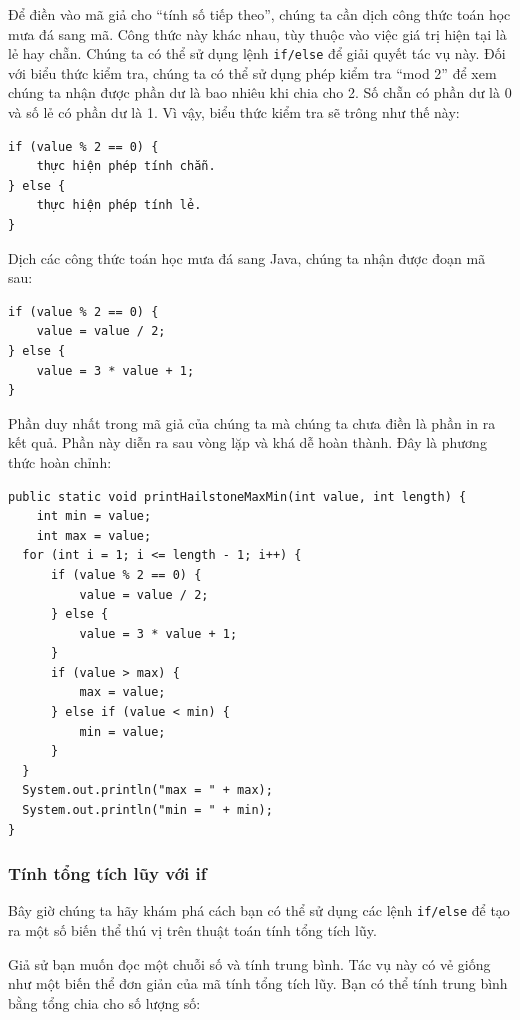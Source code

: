 Để điền vào mã giả cho ``tính số tiếp theo'', chúng ta cần dịch công
thức toán học mưa đá sang mã. Công thức này khác nhau, tùy thuộc vào
việc giá trị hiện tại là lẻ hay chẵn. Chúng ta có thể sử dụng lệnh
\texttt{if/else} để giải quyết tác vụ này. Đối với biểu thức kiểm tra,
chúng ta có thể sử dụng phép kiểm tra ``mod 2'' để xem chúng ta nhận
được phần dư là bao nhiêu khi chia cho 2. Số chẵn có phần dư là 0 và số
lẻ có phần dư là 1. Vì vậy, biểu thức kiểm tra sẽ trông như thế này:

\begin{verbatim}
if (value % 2 == 0) {
    thực hiện phép tính chẵn.
} else {
    thực hiện phép tính lẻ.
}
\end{verbatim}

Dịch các công thức toán học mưa đá sang Java, chúng ta nhận được đoạn mã
sau:

\begin{verbatim}
if (value % 2 == 0) {
    value = value / 2;
} else {
    value = 3 * value + 1;
}
\end{verbatim}

Phần duy nhất trong mã giả của chúng ta mà chúng ta chưa điền là phần in
ra kết quả. Phần này diễn ra sau vòng lặp và khá dễ hoàn thành. Đây là
phương thức hoàn chỉnh:

\begin{verbatim}
public static void printHailstoneMaxMin(int value, int length) {
    int min = value;
    int max = value;
  for (int i = 1; i <= length - 1; i++) {
      if (value % 2 == 0) {
          value = value / 2;
      } else {
          value = 3 * value + 1;
      }
      if (value > max) {
          max = value;
      } else if (value < min) {
          min = value;
      }
  }
  System.out.println("max = " + max);
  System.out.println("min = " + min);
}
\end{verbatim}

\subsubsection{Tính tổng tích lũy với
if}\label{tuxednh-tux1ed5ng-tuxedch-lux169y-vux1edbi-if}

Bây giờ chúng ta hãy khám phá cách bạn có thể sử dụng các lệnh
\texttt{if/else} để tạo ra một số biến thể thú vị trên thuật toán tính
tổng tích lũy.

Giả sử bạn muốn đọc một chuỗi số và tính trung bình. Tác vụ này có vẻ
giống như một biến thể đơn giản của mã tính tổng tích lũy. Bạn có thể
tính trung bình bằng tổng chia cho số lượng số:

